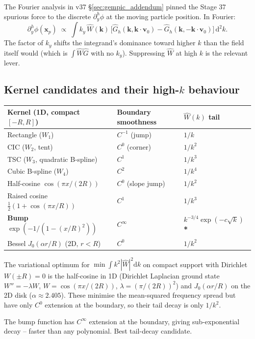 \documentclass[11pt,a4paper]{article}
\newcommand{\vv}[1]{\mathbf{#1}}
\newcommand{\dd}{\mathrm{d}}
\begin{document}
The Fourier analysis in v37 §\ref{sec:gempic_addendum} pinned the
Stage 37 spurious force to the discrete $\partial^h_y \phi$ at the
moving particle position.  In Fourier:
$$
\partial^h_y \phi(\vv x_p) \;\propto\; \int k_y \,\hat W(\vv k)\,
   \big[\hat G_h(\vv k, \vv k\cdot\vv v_0)
        - \hat G_h(\vv k, -\vv k\cdot\vv v_0)\big]\,\dd^2 k.
$$
The factor of $k_y$ shifts the integrand's dominance toward higher
$k$ than the field itself would (which is $\int \hat W \hat G$ with
no $k_y$).  Suppressing $\hat W$ at high $k$ is the relevant lever.

\subsection{Kernel candidates and their high-$k$ behaviour}

\begin{center}
\begin{tabular}{lll}
\toprule
Kernel (1D, compact $[-R, R]$) & Boundary smoothness & $\hat W(k)$ tail \\
\midrule
Rectangle ($W_1$) & $C^{-1}$ (jump) & $1/k$ \\
CIC ($W_2$, tent) & $C^0$ (corner) & $1/k^2$ \\
TSC ($W_3$, quadratic B-spline) & $C^1$ & $1/k^3$ \\
Cubic B-spline ($W_4$) & $C^2$ & $1/k^4$ \\
Half-cosine $\cos(\pi x/(2R))$ & $C^0$ (slope jump) & $1/k^2$ \\
Raised cosine $\tfrac{1}{2}(1+\cos(\pi x/R))$ & $C^1$ & $1/k^3$ \\
\textbf{Bump} $\exp(-1/(1-(x/R)^2))$ & $C^\infty$ & $k^{-3/4}\exp(-c\sqrt{k})$ \textbf{*}\\
Bessel $J_0(\alpha r/R)$ (2D, $r<R$) & $C^0$ & $1/k^{2}$ \\
\bottomrule
\end{tabular}
\end{center}

The variational optimum for $\min \int k^2 |\hat W|^2 \dd k$ on
compact support with Dirichlet $W(\pm R) = 0$ is the half-cosine in
1D (Dirichlet Laplacian ground state $W'' = -\lambda W$,
$W = \cos(\pi x/(2R))$, $\lambda = (\pi/(2R))^2$) and $J_0(\alpha r/R)$
on the 2D disk ($\alpha \approx 2.405$).  These minimise the
mean-squared frequency spread but have only $C^0$ extension at the
boundary, so their tail decay is only $1/k^2$.

The bump function has $C^\infty$ extension at the boundary, giving
sub-exponential decay -- faster than any polynomial.  Best
tail-decay candidate.
\end{document}
